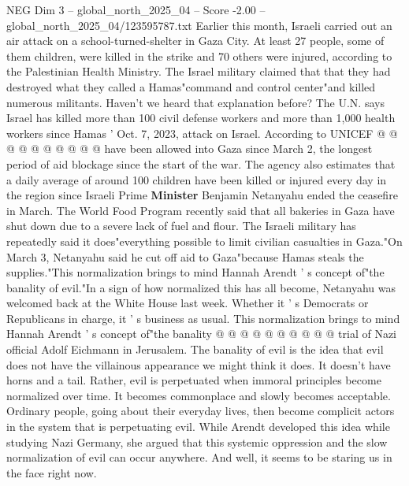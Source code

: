 \begin{textsample}{NEG Dim 3 – global\_north\_2025\_04 – Score -2.00 – global\_north\_2025\_04/123595787.txt}
Earlier this month, Israeli carried out an air attack on a school-turned-shelter in Gaza City.
At least 27 people, some of them children, were killed in the strike and 70 others were injured, according to the Palestinian Health Ministry.
The Israel military claimed that that they had destroyed what they called a Hamas"command and control center"and killed numerous militants.
Haven't we heard that explanation before?
The U.N. says Israel has killed more than 100 civil defense workers and more than 1,000 health workers since Hamas ' Oct. 7, 2023, attack on Israel.
According to UNICEF @ @ @ @ @ @ @ @ @ @ have been allowed into Gaza since March 2, the longest period of aid blockage since the start of the war.
The agency also estimates that a daily average of around 100 children have been killed or injured every day in the region since Israeli Prime \textbf{Minister} Benjamin Netanyahu ended the ceasefire in March.
The World Food Program recently said that all bakeries in Gaza have shut down due to a severe lack of fuel and flour.
The Israeli military has repeatedly said it does"everything possible to limit civilian casualties in Gaza."On March 3, Netanyahu said he cut off aid to Gaza"because Hamas steals the supplies."This normalization brings to mind Hannah Arendt ' s concept of"the banality of evil."In a sign of how normalized this has all become, Netanyahu was welcomed back at the White House last week.
Whether it ' s Democrats or Republicans in charge, it ' s business as usual.
This normalization brings to mind Hannah Arendt ' s concept of"the banality @ @ @ @ @ @ @ @ @ @ trial of Nazi official Adolf Eichmann in Jerusalem.
The banality of evil is the idea that evil does not have the villainous appearance we might think it does.
It doesn't have horns and a tail.
Rather, evil is perpetuated when immoral principles become normalized over time.
It becomes commonplace and slowly becomes acceptable.
Ordinary people, going about their everyday lives, then become complicit actors in the system that is perpetuating evil.
While Arendt developed this idea while studying Nazi Germany, she argued that this systemic oppression and the slow normalization of evil can occur anywhere.
And well, it seems to be staring us in the face right now.

\end{textsample}
